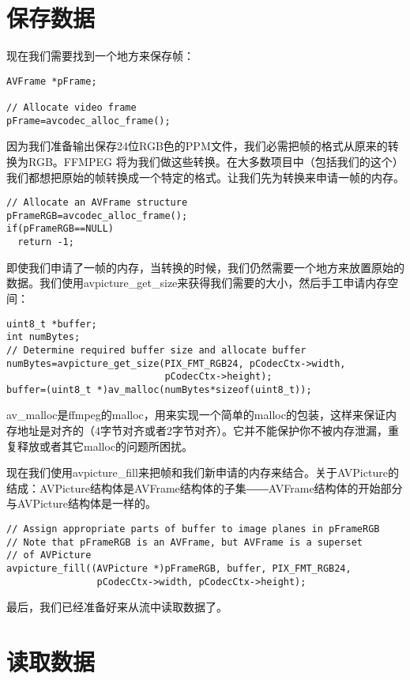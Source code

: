\section{保存数据}

现在我们需要找到一个地方来保存帧：
\begin{lstlisting}
AVFrame *pFrame;

// Allocate video frame
pFrame=avcodec_alloc_frame();
\end{lstlisting}

因为我们准备输出保存24位RGB色的PPM文件，我们必需把帧的格式从原来的转换为RGB。FFMPEG 将为我们做这些转换。在大多数项目中（包括我们的这个）我们都想把原始的帧转换成一个特定的格式。让我们先为转换来申请一帧的内存。
\begin{lstlisting}
// Allocate an AVFrame structure
pFrameRGB=avcodec_alloc_frame();
if(pFrameRGB==NULL)
  return -1;
\end{lstlisting}

即使我们申请了一帧的内存，当转换的时候，我们仍然需要一个地方来放置原始的数据。我们使用avpicture_get_size来获得我们需要的大小，然后手工申请内存空间：

\begin{lstlisting}
uint8_t *buffer;
int numBytes;
// Determine required buffer size and allocate buffer
numBytes=avpicture_get_size(PIX_FMT_RGB24, pCodecCtx->width,
                            pCodecCtx->height);
buffer=(uint8_t *)av_malloc(numBytes*sizeof(uint8_t));
\end{lstlisting}

av_malloc是ffmpeg的malloc，用来实现一个简单的malloc的包装，这样来保证内存地址是对齐的（4字节对齐或者2字节对齐）。它并不能保护你不被内存泄漏，重复释放或者其它malloc的问题所困扰。

现在我们使用avpicture_fill来把帧和我们新申请的内存来结合。关于AVPicture的结成：AVPicture结构体是AVFrame结构体的子集――AVFrame结构体的开始部分与AVPicture结构体是一样的。

\begin{lstlisting}
// Assign appropriate parts of buffer to image planes in pFrameRGB
// Note that pFrameRGB is an AVFrame, but AVFrame is a superset
// of AVPicture
avpicture_fill((AVPicture *)pFrameRGB, buffer, PIX_FMT_RGB24,
                pCodecCtx->width, pCodecCtx->height);
\end{lstlisting}

最后，我们已经准备好来从流中读取数据了。

\section{读取数据}

